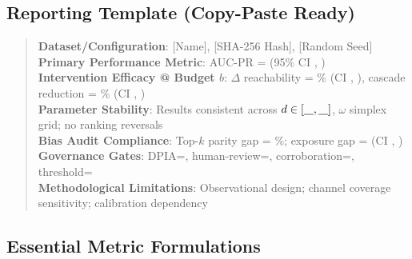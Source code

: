 \documentclass[12pt]{article}
\theoremstyle{plain}
\begin{document}
\subsection{Reporting Template (Copy-Paste Ready)}
\begin{quote}\small
\textbf{Dataset/Configuration}: [Name], [SHA-256 Hash], [Random Seed] \\
\textbf{Primary Performance Metric}: AUC-PR = \underline{\hspace{1.5cm}} (95\% CI \underline{\hspace{1cm}}, \underline{\hspace{1cm}}) \\
\textbf{Intervention Efficacy @ Budget $b$}: $\Delta$ reachability = \underline{\hspace{0.8cm}}\% (CI \underline{\hspace{0.8cm}}, \underline{\hspace{0.8cm}}), cascade reduction = \underline{\hspace{0.8cm}}\% (CI \underline{\hspace{0.8cm}}, \underline{\hspace{0.8cm}}) \\
\textbf{Parameter Stability}: Results consistent across $d\in[\underline{\hspace{0.3cm}},\underline{\hspace{0.3cm}}]$, $\omega$ simplex grid; no ranking reversals \\
\textbf{Bias Audit Compliance}: Top-$k$ parity gap = \underline{\hspace{0.5cm}}\%; exposure gap = \underline{\hspace{0.5cm}} (CI \underline{\hspace{0.5cm}}, \underline{\hspace{0.5cm}}) \\
\textbf{Governance Gates}: DPIA=\underline{\hspace{0.8cm}}, human-review=\underline{\hspace{0.8cm}}, corroboration=\underline{\hspace{0.3cm}}, threshold=\underline{\hspace{0.8cm}} \\
\textbf{Methodological Limitations}: Observational design; channel coverage sensitivity; calibration dependency \\
\end{quote}

\subsection{Essential Metric Formulations}
\end{document}
